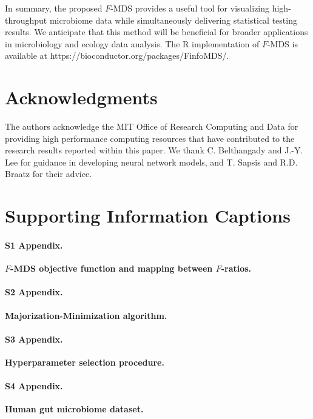 \documentclass[10pt,letterpaper]{article}
\newcommand{\1}{{\rm 1}\kern-0.24em{\rm I}}
\begin{document}
In summary, the proposed $F$-MDS provides a useful tool for visualizing high-throughput microbiome data while simultaneously delivering statistical testing results. We anticipate that this method will be beneficial for broader applications in microbiology and ecology data analysis. The R implementation of $F$-MDS is available at https://bioconductor.org/packages/FinfoMDS/.



\section*{Acknowledgments}
The authors acknowledge the MIT Office of Research Computing and Data for providing high performance computing resources that have contributed to the research results reported within this paper. We thank C. Belthangady and J.-Y. Lee for guidance in developing neural network models, and T. Sapsis and R.D. Braatz for their advice.


\nolinenumbers

% 



\section*{Supporting Information Captions}

\paragraph*{S1 Appendix.}
\label{sec:app1}
{\bf $F$-MDS objective function and mapping between $F$-ratios.}

\paragraph*{S2 Appendix.}
\label{sec:app2}
{\bf Majorization-Minimization algorithm.}

\paragraph*{S3 Appendix.}
\label{sec:app3_rev}
{\bf Hyperparameter selection procedure.}

\paragraph*{S4 Appendix.}
\label{sec:app4_rev}
{\bf Human gut microbiome dataset.}
\end{document}

